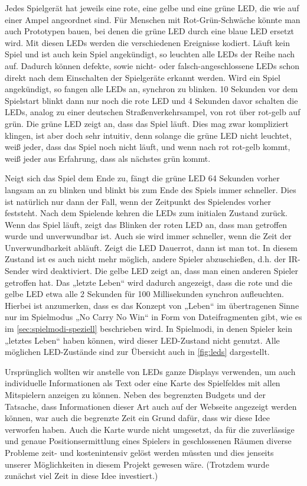 Jedes Spielgerät hat jeweils eine rote, eine gelbe und eine grüne LED, die wie auf einer Ampel
angeordnet sind.
Für Menschen mit Rot-Grün-Schwäche könnte man auch Prototypen bauen, bei denen die grüne LED durch
eine blaue LED ersetzt wird.
Mit diesen LEDs werden die verschiedenen Ereignisse kodiert.
Läuft kein Spiel und ist auch kein Spiel angekündigt, so leuchten alle LEDs der Reihe nach auf.
Dadurch können defekte, sowie nicht- oder falsch-angeschlossene LEDs schon direkt nach dem
Einschalten der Spielgeräte erkannt werden.
Wird ein Spiel angekündigt, so fangen alle LEDs an, synchron zu blinken.
10 Sekunden vor dem Spielstart blinkt dann nur noch die rote LED und 4 Sekunden davor schalten die
LEDs, analog zu einer deutschen Straßenverkehrsampel, von rot über rot-gelb auf grün.
Die grüne LED zeigt an, dass das Spiel läuft.
Dies mag zwar kompliziert klingen, ist aber doch sehr intuitiv, denn solange die grüne LED nicht
leuchtet, weiß jeder, dass das Spiel noch nicht läuft, und wenn nach rot rot-gelb kommt, weiß jeder
aus Erfahrung, dass als nächstes grün kommt.

Neigt sich das Spiel dem Ende zu, fängt die grüne LED 64 Sekunden vorher langsam an zu blinken und
blinkt bis zum Ende des Spiels immer schneller.
Dies ist natürlich nur dann der Fall, wenn der Zeitpunkt des Spielendes vorher feststeht.
Nach dem Spielende kehren die LEDs zum initialen Zustand zurück.
Wenn das Spiel läuft, zeigt das Blinken der roten LED an, dass man getroffen wurde und unverwundbar
ist.
Auch sie wird immer schneller, wenn die Zeit der Unverwundbarkeit abläuft.
Zeigt die LED Dauerrot, dann ist man tot.
In diesem Zustand ist es auch nicht mehr möglich, andere Spieler abzuschießen, d.h. der IR-Sender
wird deaktiviert.
Die gelbe LED zeigt an, dass man einen anderen Spieler getroffen hat.
Das „letzte Leben“ wird dadurch angezeigt, dass die rote und die gelbe LED etwa alle 2 Sekunden für
100 Millisekunden synchron aufleuchten.
Hierbei ist anzumerken, dass es das Konzept von „Leben“ im übertragenen Sinne nur im Spielmodus
„No Carry No Win“ in Form von Dateifragmenten gibt, wie es im \cref{sec:spielmodi-speziell}
beschrieben wird.
In Spielmodi, in denen Spieler kein „letztes Leben“ haben können, wird dieser LED-Zustand nicht
genutzt.
Alle möglichen LED-Zustände sind zur Übersicht auch in \cref{fig:leds} dargestellt.

Ursprünglich wollten wir anstelle von LEDs ganze Displays verwenden, um auch individuelle
Informationen als Text oder eine Karte des Spielfeldes mit allen Mitspielern anzeigen zu können.
Neben des begrenzten Budgets und der Tatsache, dass Informationen dieser Art auch auf der Webseite
angezeigt werden können, war auch die begrenzte Zeit ein Grund dafür, dass wir diese Idee verworfen
haben.
Auch die Karte wurde nicht umgesetzt, da für die zuverlässige und genaue Positionsermittlung eines
Spielers in geschlossenen Räumen diverse Probleme zeit- und kostenintensiv gelöst werden müssten und
dies jenseits unserer Möglichkeiten in diesem Projekt gewesen wäre.
(Trotzdem wurde zunächst viel Zeit in diese Idee investiert.)
